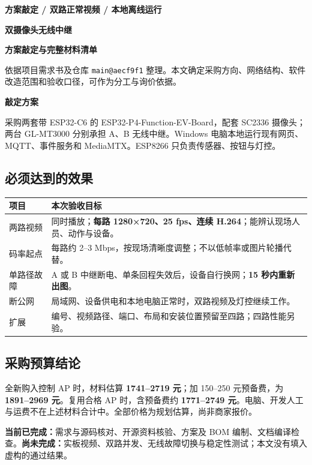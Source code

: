 \documentclass[UTF8,a4paper,11pt,fontset=windows]{ctexart}
\newcommand{\code}[1]{{\small\nolinkurl{#1}}}
\newcommand{\note}[2]{\begin{tcolorbox}[colback=pale,colframe=teal!30,boxrule=0.5pt,arc=1mm,left=9pt,right=9pt,top=7pt,bottom=7pt]\textbf{\color{navy}#1}\par #2\end{tcolorbox}}
\begin{document}
\thispagestyle{fancy}
{\small\color{teal}\bfseries 方案敲定 / 双路正常视频 / 本地离线运行}\par\vspace{8pt}
{\Huge\bfseries\color{navy}双摄像头无线中继}\par
{\LARGE\bfseries\color{navy}方案敲定与完整材料清单}\par\vspace{9pt}
依据项目需求书及仓库 \code{main@aecf9f1} 整理。本文确定采购方向、网络结构、软件改造范围和验收口径，可作为分工与询价依据。\par
\note{敲定方案}{采购两套带 ESP32-C6 的 ESP32-P4-Function-EV-Board，配套 SC2336 摄像头；两台 GL-MT3000 分别承担 A、B 无线中继。Windows 电脑本地运行现有网页、MQTT、事件服务和 MediaMTX。ESP8266 只负责传感器、按钮与灯控。}
\subsection*{必须达到的效果}
\par\noindent\begin{tabularx}{\linewidth}{@{}p{28mm}Y@{}}\toprule
项目 & 本次验收目标 \\\midrule
两路视频 & 同时播放；\textbf{每路 1280×720、25 fps、连续 H.264}；能辨认现场人员、动作与设备。\\
码率起点 & 每路约 2--3 Mbps，按现场清晰度调整；不以低帧率或图片轮播代替。\\
单路径故障 & A 或 B 中继断电、单条回程失效后，设备自行换网；\textbf{15 秒内重新出图}。\\
断公网 & 局域网、设备供电和本地电脑正常时，双路视频及灯控继续工作。\\
扩展 & 编号、视频路径、端口、布局和安装位置预留至四路；四路性能另验。\\\bottomrule
\end{tabularx}\par
\subsection*{采购预算结论}
全新购入控制 AP 时，材料估算 \textbf{1741--2719 元}；加 150--250 元预备费，为 \textbf{1891--2969 元}。复用合格 AP 时，含预备费约 \textbf{1771--2749 元}。电脑、开发人工与运费不在上述材料合计中。全部价格为规划估算，尚非商家报价。

\textbf{当前已完成：}需求与源码核对、开源资料核验、方案及 BOM 编制、文档编译检查。\textbf{尚未完成：}实板视频、双路并发、无线故障切换与稳定性测试；本文没有填入虚构的通过结果。
\end{document}
